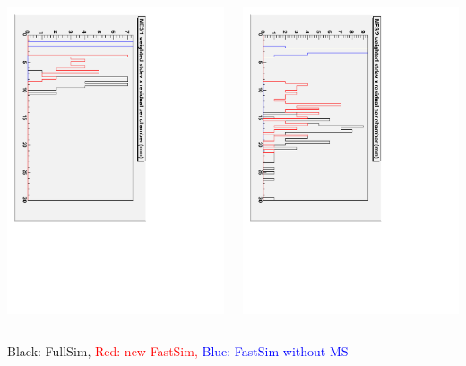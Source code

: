 \documentclass[compress]{beamer}
\begin{document}
\begin{frame}
\begin{columns}
\includegraphics[height=\linewidth, angle=90]{stdevs_me31.pdf}

\includegraphics[height=\linewidth, angle=90]{stdevs_me32.pdf}
\end{columns}

\small
Black: FullSim, \textcolor{red}{Red: new FastSim,} \textcolor{blue}{Blue: FastSim without MS}
\end{frame}
\end{document}
